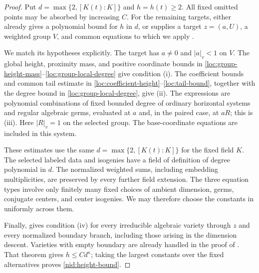 \begin{proof}
Put $d=\max\{2,[K(t):K]\}$ and $h=h(t)\ge2$.  All fixed omitted
points may be absorbed by increasing $C$.  For the remaining targets,
 either already gives a polynomial bound for $h$ in
$d$, or supplies a target $z=(a,U)$, a weighted group $V$, and common
equations to which we apply .

We match its hypotheses explicitly.  The target has $a\ne0$ and
$|a|_v<1$ on $V$.  The global height, proximity mass, and positive
coordinate bounds in
\eqref{loc:group-height-mass}--\eqref{loc:group-local-degree} give
condition \textup{(i)}.  The coefficient bounds and common tail
estimate in \eqref{loc:coefficient-height}--\eqref{loc:tail-bound},
together with the degree bound in \eqref{loc:group-local-degree},
give \textup{(ii)}.  The expressions are polynomial combinations of
fixed bounded degree of ordinary horizontal systems and regular
algebraic germs, evaluated at $a$ and, in the paired case, at $aR$;
this is \textup{(iii)}.  Here $|R|_v=1$ on the selected group.
The base-coordinate equations are included in this system.

These estimates use the same $d=\max\{2,[K(t):K]\}$ for the fixed
field $K$.  The selected labeled data and isogenies have a field of
definition of degree polynomial in $d$.  The normalized weighted sums,
including embedding multiplicities, are preserved by every further
field extension.  The three equation
types involve only finitely many fixed choices of ambient dimension,
germs, conjugate centers, and center isogenies.  We may therefore choose
the constants in  uniformly across them.

Finally,  gives condition \textup{(iv)} for
every irreducible algebraic variety through $z$ and every normalized
boundary branch, including those arising in the dimension descent.
Varieties with empty boundary are already handled in the proof of
.  That theorem gives $h\le Cd^\kappa$; taking the
largest constants over the fixed alternatives proves
\eqref{nid:height-bound}.
\end{proof}
